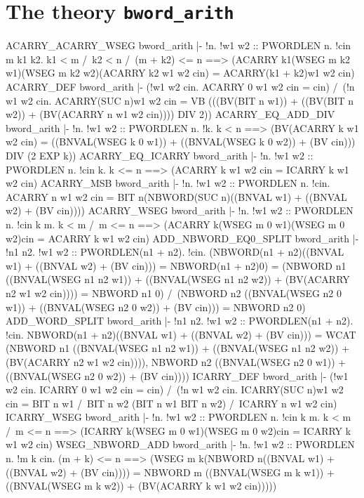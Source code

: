 \section{The theory {\tt bword\_arith}}
\THEOREM ACARRY\_ACARRY\_WSEG bword\_arith
|- !n.
    !w1 w2 :: PWORDLEN n.
     !cin m k1 k2.
      k1 < m /\ k2 < n /\ (m + k2) <= n ==>
      (ACARRY k1(WSEG m k2 w1)(WSEG m k2 w2)(ACARRY k2 w1 w2 cin) =
       ACARRY(k1 + k2)w1 w2 cin)
\ENDTHEOREM
\THEOREM ACARRY\_DEF bword\_arith
|- (!w1 w2 cin. ACARRY 0 w1 w2 cin = cin) /\
   (!n w1 w2 cin.
     ACARRY(SUC n)w1 w2 cin =
     VB
     (((BV(BIT n w1)) + ((BV(BIT n w2)) + (BV(ACARRY n w1 w2 cin)))) DIV
      2))
\ENDTHEOREM
\THEOREM ACARRY\_EQ\_ADD\_DIV bword\_arith
|- !n.
    !w1 w2 :: PWORDLEN n.
     !k.
      k < n ==>
      (BV(ACARRY k w1 w2 cin) =
       ((BNVAL(WSEG k 0 w1)) + ((BNVAL(WSEG k 0 w2)) + (BV cin))) DIV
       (2 EXP k))
\ENDTHEOREM
\THEOREM ACARRY\_EQ\_ICARRY bword\_arith
|- !n.
    !w1 w2 :: PWORDLEN n.
     !cin k. k <= n ==> (ACARRY k w1 w2 cin = ICARRY k w1 w2 cin)
\ENDTHEOREM
\THEOREM ACARRY\_MSB bword\_arith
|- !n.
    !w1 w2 :: PWORDLEN n.
     !cin.
      ACARRY n w1 w2 cin =
      BIT n(NBWORD(SUC n)((BNVAL w1) + ((BNVAL w2) + (BV cin))))
\ENDTHEOREM
\THEOREM ACARRY\_WSEG bword\_arith
|- !n.
    !w1 w2 :: PWORDLEN n.
     !cin k m.
      k < m /\ m <= n ==>
      (ACARRY k(WSEG m 0 w1)(WSEG m 0 w2)cin = ACARRY k w1 w2 cin)
\ENDTHEOREM
\THEOREM ADD\_NBWORD\_EQ0\_SPLIT bword\_arith
|- !n1 n2.
    !w1 w2 :: PWORDLEN(n1 + n2).
     !cin.
      (NBWORD(n1 + n2)((BNVAL w1) + ((BNVAL w2) + (BV cin))) =
       NBWORD(n1 + n2)0) =
      (NBWORD 
       n1
       ((BNVAL(WSEG n1 n2 w1)) +
        ((BNVAL(WSEG n1 n2 w2)) + (BV(ACARRY n2 w1 w2 cin)))) =
       NBWORD n1 0) /\
      (NBWORD 
       n2
       ((BNVAL(WSEG n2 0 w1)) + ((BNVAL(WSEG n2 0 w2)) + (BV cin))) =
       NBWORD n2 0)
\ENDTHEOREM
\THEOREM ADD\_WORD\_SPLIT bword\_arith
|- !n1 n2.
    !w1 w2 :: PWORDLEN(n1 + n2).
     !cin.
      NBWORD(n1 + n2)((BNVAL w1) + ((BNVAL w2) + (BV cin))) =
      WCAT
      (NBWORD 
       n1
       ((BNVAL(WSEG n1 n2 w1)) +
        ((BNVAL(WSEG n1 n2 w2)) + (BV(ACARRY n2 w1 w2 cin)))),
       NBWORD 
       n2
       ((BNVAL(WSEG n2 0 w1)) + ((BNVAL(WSEG n2 0 w2)) + (BV cin))))
\ENDTHEOREM
\THEOREM ICARRY\_DEF bword\_arith
|- (!w1 w2 cin. ICARRY 0 w1 w2 cin = cin) /\
   (!n w1 w2 cin.
     ICARRY(SUC n)w1 w2 cin =
     BIT n w1 /\ BIT n w2 \/
     (BIT n w1 \/ BIT n w2) /\ ICARRY n w1 w2 cin)
\ENDTHEOREM
\THEOREM ICARRY\_WSEG bword\_arith
|- !n.
    !w1 w2 :: PWORDLEN n.
     !cin k m.
      k < m /\ m <= n ==>
      (ICARRY k(WSEG m 0 w1)(WSEG m 0 w2)cin = ICARRY k w1 w2 cin)
\ENDTHEOREM
\THEOREM WSEG\_NBWORD\_ADD bword\_arith
|- !n.
    !w1 w2 :: PWORDLEN n.
     !m k cin.
      (m + k) <= n ==>
      (WSEG m k(NBWORD n((BNVAL w1) + ((BNVAL w2) + (BV cin)))) =
       NBWORD 
       m
       ((BNVAL(WSEG m k w1)) +
        ((BNVAL(WSEG m k w2)) + (BV(ACARRY k w1 w2 cin)))))
\ENDTHEOREM
